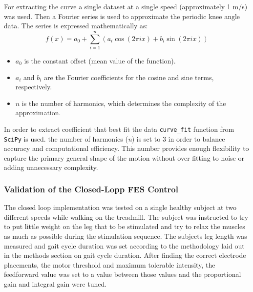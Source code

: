 For extracting the curve a single dataset at a single speed (approximately 1 m/s) was used. Then a Fourier series is used to approximate the periodic knee angle data. The series is expressed mathematically as:
\begin{equation}
f(x) = a_0 + \sum_{i=1}^{n} \left( a_i \cos(2\pi i x) + b_i \sin(2\pi i x) \right)
\end{equation}

\begin{itemize}
    \item \(a_0\) is the constant offset (mean value of the function).
    \item \(a_i\) and \(b_i\) are the Fourier coefficients for the cosine and sine terms, respectively.
    \item \(n\) is the number of harmonics, which determines the complexity of the approximation.
\end{itemize}

In order to extract coefficient that best fit the data \texttt{curve\_fit} function from \texttt{SciPy} is used. the number of harmonics (\textit{n}) is set to 3 in order to balance accuracy and computational efficiency. This number provides enough flexibility to capture the primary general shape of the motion without over fitting to noise or adding unnecessary complexity.

\subsubsection{Validation of the Closed-Lopp FES Control}
The closed loop implementation was tested on a single healthy subject at two different speeds while walking on the treadmill. The subject was instructed to try to put little weight on the leg that to be stimulated and try to relax the muscles as much as possible during the stimulation sequence. The subjects leg length was measured and gait cycle duration was set according to the methodology laid out in the methods section on gait cycle duration. After finding the correct electrode placements, the motor threshold and maximum tolerable intensity, the feedforward value was set to a value between those values and the proportional gain and integral gain were tuned. 

